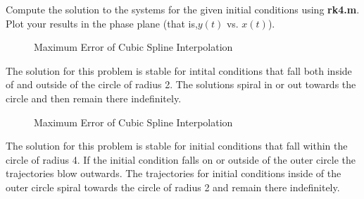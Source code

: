 Compute the solution to the systems for the given initial conditions using \textbf{rk4.m}. Plot your results in the phase plane (that is,$ y(t)$ vs. $x(t)$).

\begin{questions}

\begin{solution}

\begin{figure}[H]
\caption{Maximum Error of Cubic Spline Interpolation}
\end{figure}


The solution for this problem is stable for intital conditions that fall both inside of and outside of the circle of radius 2. The solutions spiral in or out towards the circle and then remain there indefinitely.

\end{solution}



\begin{solution}

\begin{figure}[H]
\caption{Maximum Error of Cubic Spline Interpolation}
\end{figure}

The solution for this problem is stable for initial conditions that  fall within the circle of radius 4. If the initial condition falls on or outside of the outer circle the trajectories blow outwards. The trajectories for initial conditions inside of the outer circle spiral towards the circle of radius 2 and remain there indefinitely.


\end{solution}
\end{questions}
